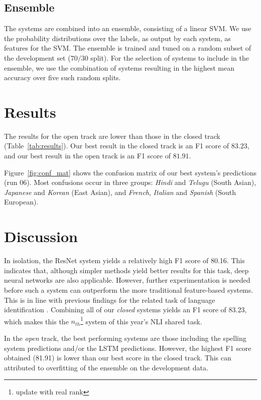 \documentclass[11pt,letterpaper]{article}
\begin{document}
\subsection{Ensemble}
The systems are combined into an ensemble, consisting of a linear SVM.
We use the probability distributions over the labels, as output by each system, as features for the SVM.
The ensemble is trained and tuned on a random subset of the development set ($70/30$ split).
For the selection of systems to include in the ensemble, we use the combination of systems resulting in the highest mean accuracy over five such random splits.


\section{Results}
The results for the open track are lower than those in the closed track (Table~\ref{tab:results}).
Our best result in the closed track is an F1 score of $83.23$, and our best result in the open track is an F1 score of $81.91$.

Figure~\ref{fig:conf_mat} shows the confusion matrix of our best system's predictions (run 06).
Most confusions occur in three groups: \textit{Hindi} and \textit{Telugu} (South Asian), \textit{Japanese} and \textit{Korean} (East Asian), and \textit{French}, \textit{Italian} and \textit{Spanish} (South European).


\section{Discussion}

In isolation, the ResNet system yields a relatively high F1 score of 80.16.
This indicates that, although simpler methods yield better results for this task, deep neural networks are also applicable.
However, further experimentation is needed before such a system can outperform the more traditional feature-based systems.
This is in line with previous findings for the related task of language identification \citep{medvedeva:2017}.
Combining all of our \textit{closed} systems yields an F1 score of 83.23, which makes this the $n_{th}$\footnote{update with real rank} system of this year's NLI shared task.

In the \textit{open} track, the best performing systems are those including the spelling system predictions and/or the LSTM predictions.
However, the highest F1 score obtained (81.91) is lower than our best score in the closed track.
This can attributed to overfitting of the ensemble on the development data.
\end{document}
